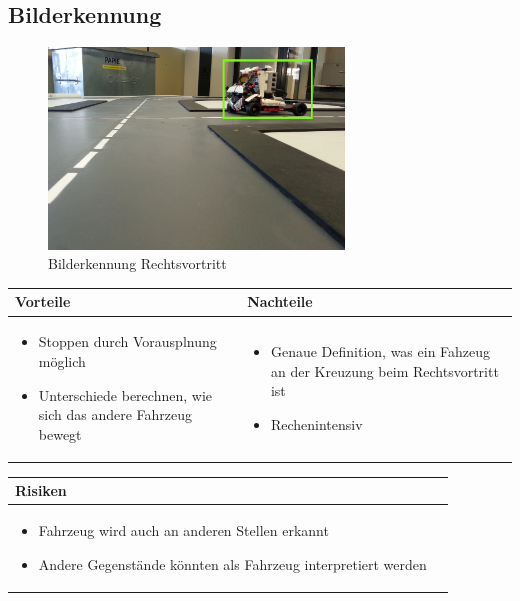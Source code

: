 \pagebreak


\subsection{Bilderkennung}

\begin{figure}[h!]%
\centering
\includegraphics[width=0.7\textwidth]{fig/rechtsvortritt_bilderkennung.png}
\caption{Bilderkennung Rechtsvortritt}
\label{fig:Bilderkennung Rechtsvortritt}
\end{figure}

\begin{table}[h]
\begin{tabular}{p{} | p{}}


 \textbf{Vorteile} & \textbf{Nachteile} \\ \hline
	 
\begin{itemize}
\item Stoppen durch Vorausplnung möglich
\item Unterschiede berechnen, wie sich das andere Fahrzeug bewegt
\end{itemize}

 
 &
 
\begin{itemize}
\item Genaue Definition, was ein Fahzeug an der Kreuzung beim Rechtsvortritt ist
\item Rechenintensiv
\end{itemize}

\end{tabular}
\end{table}

\begin{table}[h]
\begin{tabular}{p{}p{}}


\textbf{Risiken} & \\ \hline
	 
\begin{itemize}
\item Fahrzeug wird auch an anderen Stellen erkannt
\item Andere Gegenstände könnten als Fahrzeug interpretiert werden

\end{itemize}

 
\end{tabular}
\end{table}

\pagebreak